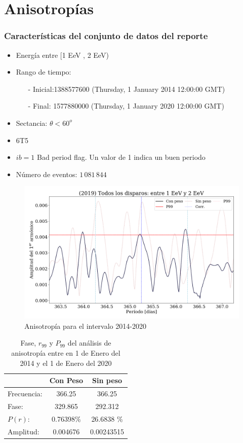 \section{Anisotropías}

\subsubsection{Características del conjunto de datos del reporte}

\begin{itemize}
	\item Energía entre  [1 EeV , 2 EeV)
	\item Rango de tiempo:
	\begin{itemize}
		\item[-] Inicial:1388577600 (Thursday, 1 January 2014 12:00:00 GMT)
		\item[-] Final: 1577880000  (Thursday, 1 January 2020 12:00:00 GMT)
	\end{itemize}
	\item Sectancia:  $\theta < 60^o$
	\item 6T5
	\item $ib=1$ Bad period flag. Un valor de 1 indica un buen periodo
	\item Número de eventos: $1\,081\,844$
\end{itemize}


\begin{figure}[H]
	\centering
	\includegraphics[width=0.8\linewidth]{../report_4_12_05_2020/2019_AllTriggers_1_2_EeV_con_vs_sin_peso.png}
	\caption{Anisotropía para el intervalo 2014-2020}
	\label{fig:anis}
\end{figure}

\begin{table}[H]
\centering
\begin{tabular}{l|c|c}
				& Con Peso 	& Sin peso 		\\ \hline
Frecuencia:		& 366.25 	& 366.25 		\\
Fase:			& 329.865 	& 292.312		\\
$P(r)$:			& 0.76398\%	& 26.6838 \% 	\\
Amplitud:		& 0.004676 	& 0.00243515	\\
\end{tabular}
\caption{Fase, $r_{99}$ y $P_{99}$ del análisis de anisotropía entre en 1 de Enero del 2014 y el 1 de Enero del 2020}
\end{table}



